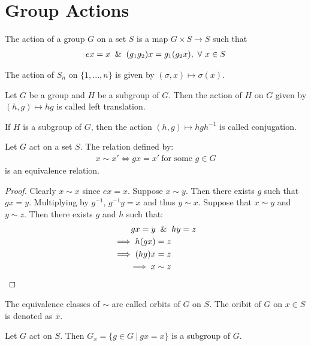 \section{Group Actions}
\begin{definition}
  The action of a group $G$ on a set $S$ is a map $G\times S\to S$ such that
  \begin{align*}
    ex = x \And (g_1g_2)x = g_1(g_2x),\ \forall\ x\in S
  \end{align*}
\end{definition}
\begin{example}
  The action of $S_n$ on $\{1,...,n\}$ is given by $(\sigma, x) \mapsto \sigma(x)$.
\end{example}
\begin{example}
  Let $G$ be a group and $H$ be a subgroup of $G$. Then the action of $H$ on $G$ given by $(h,g) \mapsto hg$ is called left translation.
\end{example}
\begin{example}
  If $H$ is a subgroup of $G$, then the action $(h,g) \mapsto hgh^{-1}$ is called conjugation.
\end{example}
\begin{theorem}\label{thm:action_relation}
  Let $G$ act on a set $S$. The relation defined by:
  \begin{align*}
    x\sim x' \iff gx = x'\ \text{for some $g\in G$} 
  \end{align*}
  is an equivalence relation.
\end{theorem}
\begin{proof}
  Clearly $x\sim x$ since $ex = x$. Suppose $x\sim y$. Then there exists $g$ such that $gx = y$. Multiplying by $g^{-1}$, $g^{-1}y = x$ and thus $y\sim x$. Suppose that $x\sim y$ and $y\sim z$. Then there exists $g$ and $h$ such that:
  \begin{align*}
    gx = y &\And hy = z\\
    \implies h(gx) &= z\\
    \implies (hg)x &= z\\
    \implies x &\sim z
  \end{align*}
\end{proof}
\begin{definition}
  The equivalence classes of $\sim$ are called orbits of $G$ on $S$. The oribit of $G$ on $x\in S$ is denoted as $\bar{x}$.
\end{definition}
\begin{theorem}
  Let $G$ act on $S$. Then $G_x = \{g\in G\ |\ gx=x\}$ is a subgroup of $G$.
\end{theorem}
